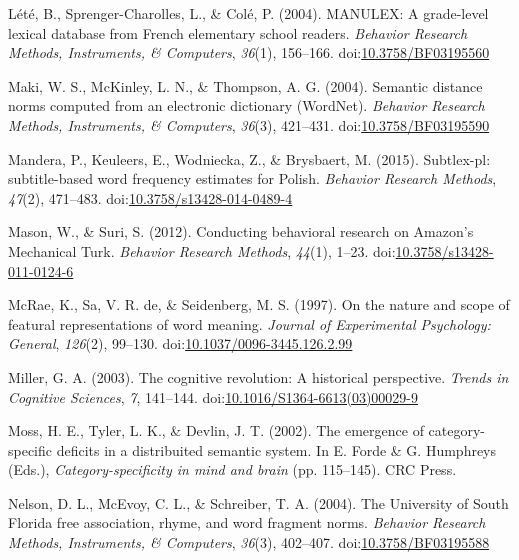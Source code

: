 \documentclass[english,man]{apa6}
\theoremstyle{definition}
\theoremstyle{definition}
\theoremstyle{definition}
\theoremstyle{remark}
\begin{document}
\hypertarget{ref-Lete2004}{}
Lété, B., Sprenger-Charolles, L., \& Colé, P. (2004). MANULEX: A
grade-level lexical database from French elementary school readers.
\emph{Behavior Research Methods, Instruments, \& Computers},
\emph{36}(1), 156--166.
doi:\href{https://doi.org/10.3758/BF03195560}{10.3758/BF03195560}

\hypertarget{ref-Maki2004}{}
Maki, W. S., McKinley, L. N., \& Thompson, A. G. (2004). Semantic
distance norms computed from an electronic dictionary (WordNet).
\emph{Behavior Research Methods, Instruments, \& Computers},
\emph{36}(3), 421--431.
doi:\href{https://doi.org/10.3758/BF03195590}{10.3758/BF03195590}

\hypertarget{ref-Mandera2015}{}
Mandera, P., Keuleers, E., Wodniecka, Z., \& Brysbaert, M. (2015).
Subtlex-pl: subtitle-based word frequency estimates for Polish.
\emph{Behavior Research Methods}, \emph{47}(2), 471--483.
doi:\href{https://doi.org/10.3758/s13428-014-0489-4}{10.3758/s13428-014-0489-4}

\hypertarget{ref-Mason2012}{}
Mason, W., \& Suri, S. (2012). Conducting behavioral research on
Amazon's Mechanical Turk. \emph{Behavior Research Methods},
\emph{44}(1), 1--23.
doi:\href{https://doi.org/10.3758/s13428-011-0124-6}{10.3758/s13428-011-0124-6}

\hypertarget{ref-McRae1997}{}
McRae, K., Sa, V. R. de, \& Seidenberg, M. S. (1997). On the nature and
scope of featural representations of word meaning. \emph{Journal of
Experimental Psychology: General}, \emph{126}(2), 99--130.
doi:\href{https://doi.org/10.1037/0096-3445.126.2.99}{10.1037/0096-3445.126.2.99}

\hypertarget{ref-Miller2003}{}
Miller, G. A. (2003). The cognitive revolution: A historical
perspective. \emph{Trends in Cognitive Sciences}, \emph{7}, 141--144.
doi:\href{https://doi.org/10.1016/S1364-6613(03)00029-9}{10.1016/S1364-6613(03)00029-9}

\hypertarget{ref-Moss2002}{}
Moss, H. E., Tyler, L. K., \& Devlin, J. T. (2002). The emergence of
category-specific deficits in a distribuited semantic system. In E.
Forde \& G. Humphreys (Eds.), \emph{Category-specificity in mind and
brain} (pp. 115--145). CRC Press.

\hypertarget{ref-Nelson2004}{}
Nelson, D. L., McEvoy, C. L., \& Schreiber, T. A. (2004). The University
of South Florida free association, rhyme, and word fragment norms.
\emph{Behavior Research Methods, Instruments, \& Computers},
\emph{36}(3), 402--407.
doi:\href{https://doi.org/10.3758/BF03195588}{10.3758/BF03195588}
\end{document}
